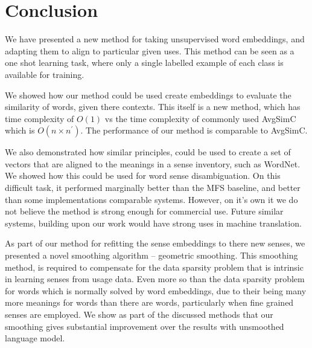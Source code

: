 \documentclass{sig-alternate}
\begin{document}
\section{Conclusion}\label{conclusion}

We have presented a new method for taking unsupervised word embeddings, and adapting them to align to particular given uses. This method can be seen as a one shot learning task, where only a single labelled example of each class is available for training.


We showed how our method could be used create embeddings to evaluate the similarity of words, given there contexts. This itself is a new method, which has time complexity of $O(1)$ vs the time complexity of commonly used AvgSimC which is $O(n \times n^\prime)$.
The performance of our method is comparable to AvgSimC.

We also demonstrated how similar principles, could be used to create a set of vectors that are aligned to the meanings in a sense inventory, such as WordNet. We showed how this could be used for word sense disambiguation. On this difficult task, it performed marginally better than the MFS baseline, and better than some implementations comparable systems. However, on it's own it we do not believe the method is strong enough for commercial use. Future similar systems, building upon our work would have strong uses in machine translation.

As part of our method for refitting the sense embeddings to there new senses, we presented a novel smoothing algorithm -- geometric smoothing.
This smoothing method, is required to compensate for the data sparsity problem that is intrinsic in learning senses from usage data. Even more so than the data sparsity problem for words which is normally solved by word embeddings, due to their being many more meanings for words than there are words, particularly when fine grained senses are employed. We show as part of the discussed methods that our smoothing gives substantial improvement over the results with unsmoothed language model.

\newpage
\printbibliography
\end{document}
